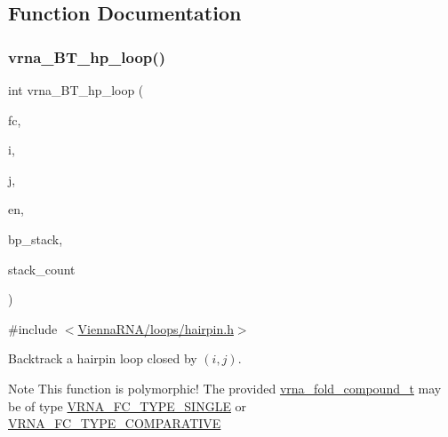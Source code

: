 \subsection{Function Documentation}
\mbox{\label{group__mfe__backtracking_gae20d5805ddedc9b81d24735b11b6a9bf}} 
\subsubsection{\texorpdfstring{vrna\+\_\+\+B\+T\+\_\+hp\+\_\+loop()}{vrna\_BT\_hp\_loop()}}
{\footnotesize\ttfamily int vrna\+\_\+\+B\+T\+\_\+hp\+\_\+loop (\begin{DoxyParamCaption}\item[{\hyperlink{group__fold__compound_ga1b0cef17fd40466cef5968eaeeff6166}{vrna\+\_\+fold\+\_\+compound\+\_\+t} $\ast$}]{fc,  }\item[{int}]{i,  }\item[{int}]{j,  }\item[{int}]{en,  }\item[{\hyperlink{group__data__structures_gaa651bda42e7692f08cb603cd6834b0ee}{vrna\+\_\+bp\+\_\+stack\+\_\+t} $\ast$}]{bp\+\_\+stack,  }\item[{int $\ast$}]{stack\+\_\+count }\end{DoxyParamCaption})}



{\ttfamily \#include $<$\hyperlink{hairpin_8h}{Vienna\+R\+N\+A/loops/hairpin.\+h}$>$}



Backtrack a hairpin loop closed by $ (i,j) $. 

\begin{DoxyNote}{Note}
This function is polymorphic! The provided \hyperlink{group__fold__compound_ga1b0cef17fd40466cef5968eaeeff6166}{vrna\+\_\+fold\+\_\+compound\+\_\+t} may be of type \hyperlink{group__fold__compound_gga01a4ff86fa71deaaa5d1abbd95a1447da7e264dd3cf2dc9b6448caabcb7763cd6}{V\+R\+N\+A\+\_\+\+F\+C\+\_\+\+T\+Y\+P\+E\+\_\+\+S\+I\+N\+G\+LE} or \hyperlink{group__fold__compound_gga01a4ff86fa71deaaa5d1abbd95a1447dab821ce46ea3cf665be97df22a76f5023}{V\+R\+N\+A\+\_\+\+F\+C\+\_\+\+T\+Y\+P\+E\+\_\+\+C\+O\+M\+P\+A\+R\+A\+T\+I\+VE} 
\end{DoxyNote}
\mbox{\label{group__mfe__backtracking_ga5b62d56c9d47c1e8792b02cd6b95e78b}} 
